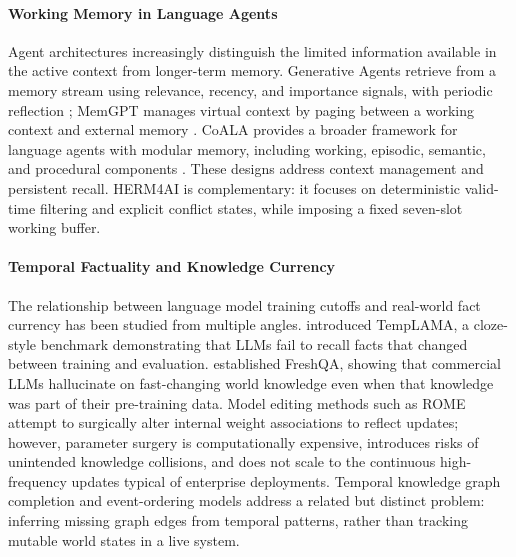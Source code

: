 \documentclass[11pt,a4paper,twocolumn]{article}
\begin{document}
\paragraph{Working Memory in Language Agents}
Agent architectures increasingly distinguish the limited information
available in the active context from longer-term memory. Generative
Agents retrieve from a memory stream using relevance, recency, and
importance signals, with periodic reflection
\citep{park2023generative}; MemGPT manages virtual context by paging
between a working context and external memory
\citep{packer2023memgpt}. CoALA provides a broader framework for
language agents with modular memory, including working, episodic,
semantic, and procedural components \citep{yao2023coala}. These designs
address context management and persistent recall. HERM4AI is
complementary: it focuses on deterministic valid-time filtering and
explicit conflict states, while imposing a fixed seven-slot working
buffer.

\paragraph{Temporal Factuality and Knowledge Currency}
The relationship between language model training cutoffs and real-world
fact currency has been studied from multiple angles.
\citet{dhingra2022templama} introduced TempLAMA, a cloze-style
benchmark demonstrating that LLMs fail to recall facts that changed
between training and evaluation.  \citet{vu2023freshqa} established
FreshQA, showing that commercial LLMs hallucinate on fast-changing
world knowledge even when that knowledge was part of their pre-training
data.  Model editing methods such as ROME \citep{meng2022locating}
attempt to surgically alter internal weight associations to reflect
updates; however, parameter surgery is computationally expensive,
introduces risks of unintended knowledge collisions, and does not scale
to the continuous high-frequency updates typical of enterprise
deployments.  Temporal knowledge graph completion and event-ordering
models address a related but distinct problem: inferring missing graph
edges from temporal patterns, rather than tracking mutable world states
in a live system.
\end{document}
